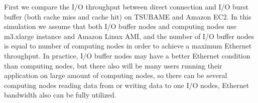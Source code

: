 	


First we compare the I/O throughput between direct connection and I/O burst buffer (both cache miss and cache hit) on TSUBAME and Amazon EC2.
In this simulation we assume that both I/O buffer nodes and computing nodes use m3.xlarge instance and Amazon Linux AMI, and the number of I/O buffer nodes is equal to number of computing nodes in order to achieve a maximum Ethernet throughput.
In practice, I/O buffer nodes may have a better Ethernet condition than computing nodes, but there also will be many users running their application on large amount of computing nodes, so there can be several computing nodes reading data from or writing data to one I/O nodes, Ethernet bandwidth also can be fully utilized. 

